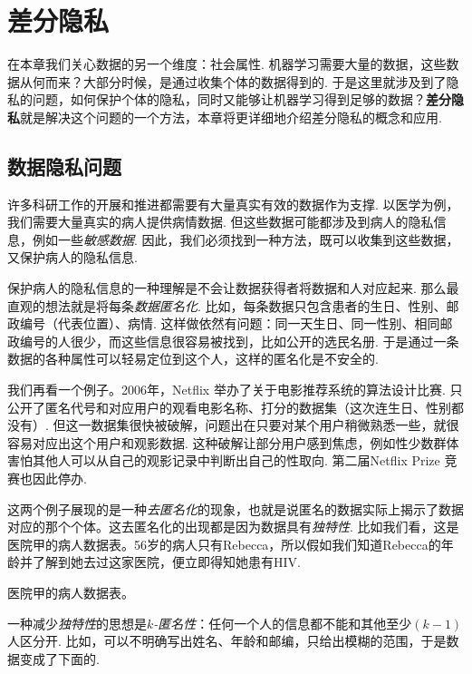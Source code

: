 \chapter{差分隐私}\label{chap:differential-privacy}
\begingroup
\newcommand{\pref}{Chapters/differential-privacy/figures}

在本章我们关心数据的另一个维度：社会属性. 机器学习需要大量的数据，这些数据从何而来？大部分时候，是通过收集个体的数据得到的. 于是这里就涉及到了隐私的问题，如何保护个体的隐私，同时又能够让机器学习得到足够的数据？\textbf{差分隐私}就是解决这个问题的一个方法，本章将更详细地介绍差分隐私的概念和应用. 

\section{数据隐私问题}

许多科研工作的开展和推进都需要有大量真实有效的数据作为支撑. 以医学为例，我们需要大量真实的病人提供病情数据. 但这些数据可能都涉及到病人的隐私信息，例如一些\emph{敏感数据}. 因此，我们必须找到一种方法，既可以收集到这些数据，又保护病人的隐私信息.

保护病人的隐私信息的一种理解是不会让数据获得者将数据和人对应起来. 那么最直观的想法就是将每条\emph{数据匿名化}. 比如，每条数据只包含患者的生日、性别、邮政编号（代表位置）、病情. 这样做依然有问题：同一天生日、同一性别、相同邮政编号的人很少，而这些信息很容易被找到，比如公开的选民名册. 于是通过一条数据的各种属性可以轻易定位到这个人，这样的匿名化是不安全的.

我们再看一个例子。2006年，Netflix 举办了关于电影推荐系统的算法设计比赛.
只公开了匿名代号和对应用户的观看电影名称、打分的数据集（这次连生日、性别都没有）. 但这一数据集很快被破解，问题出在只要对某个用户稍微熟悉一些，就很容易对应出这个用户和观影数据. 这种破解让部分用户感到焦虑，例如性少数群体害怕其他人可以从自己的观影记录中判断出自己的性取向. 第二届Netflix Prize 竞赛也因此停办.

这两个例子展现的是一种\emph{去匿名化}的现象，也就是说匿名的数据实际上揭示了数据对应的那个个体。这去匿名化的出现都是因为数据具有\emph{独特性}. 比如我们看，这是医院甲的病人数据表。56岁的病人只有Rebecca，所以假如我们知道Rebecca的年龄并了解到她去过这家医院，便立即得知她患有HIV.

\begin{table}[!ht]
\centering

\caption{医院甲的病人数据表。}
\label{tab:tab01}
\end{table}

一种减少\emph{独特性}的思想是\emph{$k$-匿名性}：任何一个人的信息都不能和其他至少$(k-1)$人区分开. 比如，可以不明确写出姓名、年龄和邮编，只给出模糊的范围，于是数据变成了下面的.

